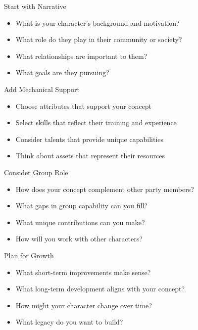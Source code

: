 \documentclass[11pt,twoside,openany]{book}
\begin{document}
Start with Narrative
\begin{itemize}
\item What is your character's background and motivation?
\item What role do they play in their community or society?
\item What relationships are important to them?
\item What goals are they pursuing?
\end{itemize}

Add Mechanical Support
\begin{itemize}
\item Choose attributes that support your concept
\item Select skills that reflect their training and experience
\item Consider talents that provide unique capabilities
\item Think about assets that represent their resources
\end{itemize}

Consider Group Role
\begin{itemize}
\item How does your concept complement other party members?
\item What gaps in group capability can you fill?
\item What unique contributions can you make?
\item How will you work with other characters?
\end{itemize}

Plan for Growth
\begin{itemize}
\item What short-term improvements make sense?
\item What long-term development aligns with your concept?
\item How might your character change over time?
\item What legacy do you want to build?
\end{itemize}
\end{document}
